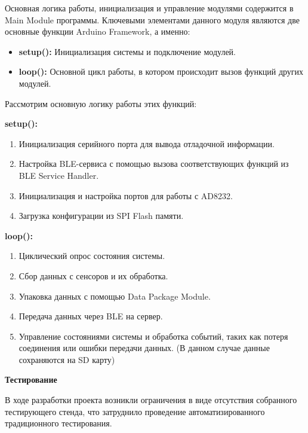 \documentclass[12pt, russian]{extarticle}
\begin{document}
\begin{spacing}{1.5}
Основная логика работы, инициализация и управление модулями содержится в Main Module программы. Ключевыми элементами данного модуля являются две основные функции Arduino Framework, а именно:

\begin{itemize}
    \item \textbf{setup():} Инициализация системы и подключение модулей.
    \item \textbf{loop():} Основной цикл работы, в котором происходит вызов функций других модулей.
\end{itemize}

Рассмотрим основную логику работы этих функций:

\par \noindent \textbf{setup():}

\begin{enumerate}
    \item Инициализация серийного порта для вывода отладочной информации.
    \item Настройка BLE-сервиса с помощью вызова соответствующих функций из BLE Service Handler.
    \item Инициализация и настройка портов для работы с AD8232.
    \item Загрузка конфигурации из SPI Flash памяти.
\end{enumerate}

\par \noindent \textbf{loop():}

\begin{enumerate}
    \item Циклический опрос состояния системы.
    \item Сбор данных с сенсоров и их обработка.
    \item Упаковка данных с помощью Data Package Module.
    \item Передача данных через BLE на сервер.
    \item Управление состояниями системы и обработка событий, таких как потеря соединения или ошибки передачи данных. (В данном случае данные сохраняются на SD карту)
\end{enumerate}

\par \noindent \textbf{Тестирование}

В ходе разработки проекта возникли ограничения в виде отсутствия собранного тестирующего стенда, что затруднило проведение автоматизированного традиционного тестирования.


\end{spacing}
\end{document}
